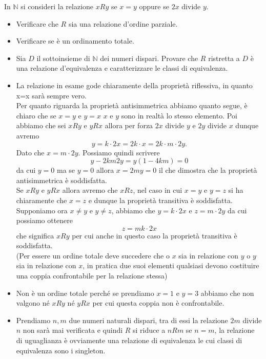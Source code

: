 \begin{esercizio}
    In $\mathbb{N}$ si consideri la relazione $xRy$ se $x = y$ oppure se $2x$ divide $y$.

\begin{itemize}\setlength\itemsep{1em}

\item Verificare che $R$ sia una relazione d'ordine parziale.

\item Verificare se è un ordinamento totale.

\item Sia $D$ il sottoinsieme di $\mathbb{N}$ dei numeri dispari. Provare che $R$ ristretta a $D$ è una relazione d'equivalenza e caratterizzare le classi di equivalenza.

\end{itemize}

\end{esercizio}

\begin{soluzione}
    \begin{itemize}\setlength\itemsep{1em}

\item La relazione in esame gode chiaramente della proprietà riflessiva, in quanto x=x sarà sempre vero.\\ Per quanto riguarda la proprietà antisimmetrica abbiamo quanto segue, è chiaro che se $x=y$ e $y=x$ $x$ e $y$ sono in realtà lo stesso elemento. Poi abbiamo che sei $xRy$ e $yRx$ allora per forza $2x$ divide $y$ e $2y$ divide $x$  dunque avremo $$y=k\cdot 2x = 2k\cdot x=2k\cdot m\cdot 2y.$$ Dato che $x=m\cdot 2y$. Possiamo quindi scrivere $$y-2km2y = y(1-4km)=0$$ da cui $y=0$ ma se $y=0$ allora $x=2my=0$ il che dimostra che la proprietà antisimmetrica è soddisfatta.\\ Se $xRy$ e $yRx$ allora avremo che $xRz$, nel caso in cui $x=y$ e $y=z$ si ha chiaramente che $x=z$ e dunque la proprietà transitiva è soddisfatta. Supponiamo ora $x\neq y$ e $y\neq z$, abbiamo che $y=k\cdot 2x$ e $z=m\cdot 2y$ da cui possiamo ottenere $$z=mk\cdot 2x$$ che significa $xRy$ per cui anche in questo caso la proprietà transitiva è soddisfatta.\\
(Per essere un ordine totale deve succedere che o $x$ sia in relazione con $y$ o $y$ sia in relazione con $x$, in pratica due suoi elementi qualsiasi devono costituire una coppia confrontabile per la relazione stessa)
\item Non è un ordine totale perché se prendiamo $x=1$ e $y=3$ abbiamo che non valgono né $xRy$ né $yRx$ per cui questa coppia non è confrontabile.

\item Prendiamo $n, m$ due numeri naturali dispari, tra di essi la relazione $2m$ divide $n$ non sarà mai verificata 
e quindi $R$ si riduce a $nRm$ se $n = m$, la relazione di uguaglianza è ovviamente una relazione di equivalenza le cui classi di equivalenza sono i singleton.

\end{itemize}

\end{soluzione}

